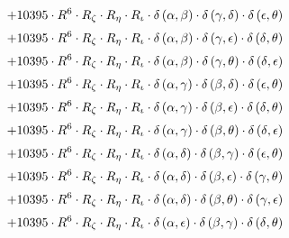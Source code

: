 \begin{subequations}
\begin{gather}
 \\[0.2em] \notag 		 + 10395 \cdot R^{6} \cdot R_{\zeta{}} \cdot R_{\eta{}} \cdot R_{\iota{}} \cdot \delta{}\left(\alpha{}, \beta{}\right) \cdot \delta{}\left(\gamma{}, \delta{}\right) \cdot \delta{}\left(\epsilon{}, \theta{}\right) 
 \\[0.2em] \notag 		 + 10395 \cdot R^{6} \cdot R_{\zeta{}} \cdot R_{\eta{}} \cdot R_{\iota{}} \cdot \delta{}\left(\alpha{}, \beta{}\right) \cdot \delta{}\left(\gamma{}, \epsilon{}\right) \cdot \delta{}\left(\delta{}, \theta{}\right) 
 \\[0.2em] \notag 		 + 10395 \cdot R^{6} \cdot R_{\zeta{}} \cdot R_{\eta{}} \cdot R_{\iota{}} \cdot \delta{}\left(\alpha{}, \beta{}\right) \cdot \delta{}\left(\gamma{}, \theta{}\right) \cdot \delta{}\left(\delta{}, \epsilon{}\right) 
 \\[0.2em] \notag 		 + 10395 \cdot R^{6} \cdot R_{\zeta{}} \cdot R_{\eta{}} \cdot R_{\iota{}} \cdot \delta{}\left(\alpha{}, \gamma{}\right) \cdot \delta{}\left(\beta{}, \delta{}\right) \cdot \delta{}\left(\epsilon{}, \theta{}\right) 
 \\[0.2em] \notag 		 + 10395 \cdot R^{6} \cdot R_{\zeta{}} \cdot R_{\eta{}} \cdot R_{\iota{}} \cdot \delta{}\left(\alpha{}, \gamma{}\right) \cdot \delta{}\left(\beta{}, \epsilon{}\right) \cdot \delta{}\left(\delta{}, \theta{}\right) 
 \\[0.2em] \notag 		 + 10395 \cdot R^{6} \cdot R_{\zeta{}} \cdot R_{\eta{}} \cdot R_{\iota{}} \cdot \delta{}\left(\alpha{}, \gamma{}\right) \cdot \delta{}\left(\beta{}, \theta{}\right) \cdot \delta{}\left(\delta{}, \epsilon{}\right) 
 \\[0.2em] \notag 		 + 10395 \cdot R^{6} \cdot R_{\zeta{}} \cdot R_{\eta{}} \cdot R_{\iota{}} \cdot \delta{}\left(\alpha{}, \delta{}\right) \cdot \delta{}\left(\beta{}, \gamma{}\right) \cdot \delta{}\left(\epsilon{}, \theta{}\right) 
 \\[0.2em] \notag 		 + 10395 \cdot R^{6} \cdot R_{\zeta{}} \cdot R_{\eta{}} \cdot R_{\iota{}} \cdot \delta{}\left(\alpha{}, \delta{}\right) \cdot \delta{}\left(\beta{}, \epsilon{}\right) \cdot \delta{}\left(\gamma{}, \theta{}\right) 
 \\[0.2em] \notag 		 + 10395 \cdot R^{6} \cdot R_{\zeta{}} \cdot R_{\eta{}} \cdot R_{\iota{}} \cdot \delta{}\left(\alpha{}, \delta{}\right) \cdot \delta{}\left(\beta{}, \theta{}\right) \cdot \delta{}\left(\gamma{}, \epsilon{}\right) 
 \\[0.2em] \notag 		 + 10395 \cdot R^{6} \cdot R_{\zeta{}} \cdot R_{\eta{}} \cdot R_{\iota{}} \cdot \delta{}\left(\alpha{}, \epsilon{}\right) \cdot \delta{}\left(\beta{}, \gamma{}\right) \cdot \delta{}\left(\delta{}, \theta{}\right) 

\end{gather}
\end{subequations}
